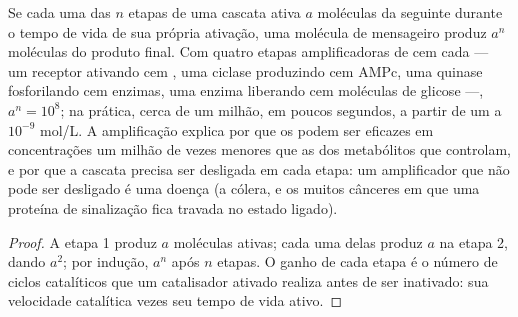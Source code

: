 \begin{theorem}\label{thm:b2:cell-signalling:amplification}
Se cada uma das $n$ etapas de uma cascata ativa $a$ moléculas da
seguinte durante o tempo de vida de sua própria ativação, uma molécula
de mensageiro produz $a^{n}$ moléculas do produto final. Com quatro
etapas amplificadoras de cem cada --- um receptor ativando cem , uma ciclase produzindo cem AMPc, uma quinase fosforilando cem
enzimas, uma enzima liberando cem moléculas de glicose ---,
$a^{n} = 10^{8}$; na prática, cerca de um milhão, em poucos segundos, a partir de
um  a $10^{-9}$ mol/L. A amplificação explica por que os
 podem ser eficazes em concentrações um milhão de vezes
menores que as dos metabólitos que controlam, e por que a cascata
precisa ser desligada em cada etapa: um amplificador que não pode ser
desligado é uma doença (a cólera, e os muitos cânceres em que uma
proteína de sinalização fica travada no estado ligado).
\end{theorem}
\begin{proof}
A etapa 1 produz $a$ moléculas ativas; cada uma delas produz $a$ na
etapa 2, dando $a^{2}$; por indução, $a^{n}$ após $n$ etapas. O ganho de
cada etapa é o número de ciclos catalíticos que um catalisador ativado
realiza antes de ser inativado: sua velocidade catalítica vezes seu
tempo de vida ativo.
\end{proof}

